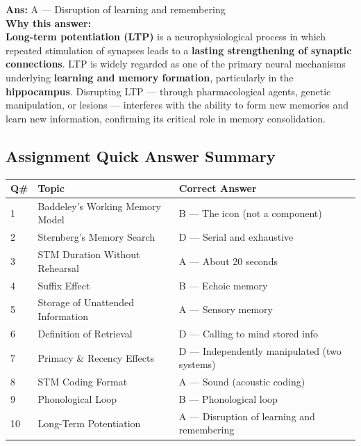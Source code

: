 \documentclass[11pt,a4paper]{article}
\newcommand{\bb}[1]{\textbf{#1}}
\begin{document}
\vspace{0.3cm}
\noindent\textbf{Ans:} A — Disruption of learning and remembering\\[0.2cm]
\textbf{Why this answer:} \\
\textbf{Long-term potentiation (LTP)} is a neurophysiological process in which repeated stimulation of synapses leads to a \textbf{lasting strengthening of synaptic connections}. LTP is widely regarded as one of the primary neural mechanisms underlying \textbf{learning and memory formation}, particularly in the \textbf{hippocampus}. Disrupting LTP — through pharmacological agents, genetic manipulation, or lesions — interferes with the ability to form new memories and learn new information, confirming its critical role in memory consolidation.
\vspace{0.4cm}

\medskip
\subsection*{Assignment Quick Answer Summary}

\begin{center}
\renewcommand{\arraystretch}{1.4}
\begin{tabular}{|L{0.8cm}|L{6.2cm}|L{8.2cm}|}
\hline
\bb{Q\#} & \bb{Topic} & \bb{Correct Answer} \\
 & Baddeley's Working Memory Model & B — The icon (not a component) \\
2 & Sternberg's Memory Search & D — Serial and exhaustive \\
3 & STM Duration Without Rehearsal & A — About 20 seconds \\
4 & Suffix Effect & B — Echoic memory \\
5 & Storage of Unattended Information & A — Sensory memory \\
6 & Definition of Retrieval & D — Calling to mind stored info \\
7 & Primacy \& Recency Effects & D — Independently manipulated (two systems) \\
8 & STM Coding Format & A — Sound (acoustic coding) \\
9 & Phonological Loop & B — Phonological loop \\
10 & Long-Term Potentiation & A — Disruption of learning and remembering \\
\hline
\end{tabular}
\end{center}

\medskip
\end{document}
